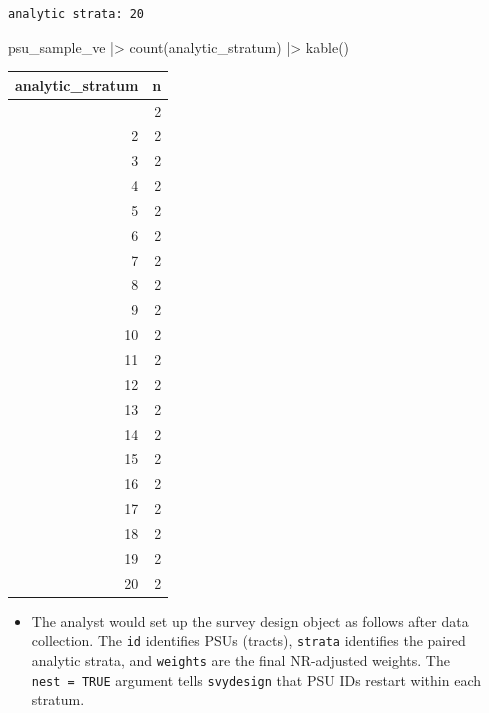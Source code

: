 \documentclass[
  11pt,
]{article}
\newenvironment{Shaded}{\begin{snugshade}}{\end{snugshade}}
\newcommand{\FunctionTok}[1]{\textcolor[rgb]{0.28,0.35,0.67}{#1}}
\newcommand{\NormalTok}[1]{\textcolor[rgb]{0.00,0.23,0.31}{#1}}
\newcommand{\SpecialCharTok}[1]{\textcolor[rgb]{0.37,0.37,0.37}{#1}}
\providecommand{\tightlist}{%
  \setlength{\itemsep}{0pt}\setlength{\parskip}{0pt}}\usepackage{longtable,booktabs,array}
\begin{document}
\begin{verbatim}
analytic strata: 20 
\end{verbatim}

\begin{Shaded}
\begin{Highlighting}[]
\NormalTok{psu\_sample\_ve }\SpecialCharTok{|\textgreater{}} \FunctionTok{count}\NormalTok{(analytic\_stratum) }\SpecialCharTok{|\textgreater{}} \FunctionTok{kable}\NormalTok{()}
\end{Highlighting}
\end{Shaded}

\begin{longtable}[]{@{}rr@{}}
\toprule\noalign{}
analytic\_stratum & n \\
\midrule\noalign{}
\endhead
\bottomrule\noalign{}
\endlastfoot
1 & 2 \\
2 & 2 \\
3 & 2 \\
4 & 2 \\
5 & 2 \\
6 & 2 \\
7 & 2 \\
8 & 2 \\
9 & 2 \\
10 & 2 \\
11 & 2 \\
12 & 2 \\
13 & 2 \\
14 & 2 \\
15 & 2 \\
16 & 2 \\
17 & 2 \\
18 & 2 \\
19 & 2 \\
20 & 2 \\
\end{longtable}

\begin{itemize}
\tightlist
\item
  The analyst would set up the survey design object as follows after
  data collection. The \texttt{id} identifies PSUs (tracts),
  \texttt{strata} identifies the paired analytic strata, and
  \texttt{weights} are the final NR-adjusted weights. The
  \texttt{nest\ =\ TRUE} argument tells \texttt{svydesign} that PSU IDs
  restart within each stratum.
\end{itemize}
\end{document}
